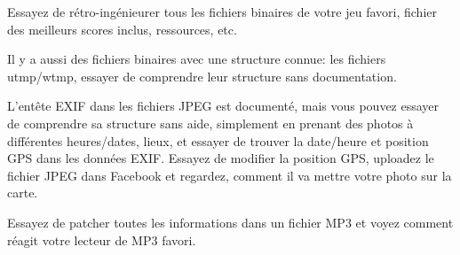 
Essayez de rétro-ingénieurer tous les fichiers binaires de votre jeu favori, fichier
des meilleurs scores inclus, ressources, etc.

Il y a aussi des fichiers binaires avec une structure connue: les fichiers utmp/wtmp,
essayer de comprendre leur structure sans documentation.

L'entête EXIF dans les fichiers JPEG est documenté, mais vous pouvez essayer de comprendre
sa structure sans aide, simplement en prenant des photos à différentes heures/dates,
lieux, et essayer de trouver la date/heure et position GPS dans les données EXIF.
Essayez de modifier la position GPS, uploadez le fichier JPEG dans Facebook et regardez,
comment il va mettre votre photo sur la carte.

Essayez de patcher toutes les informations dans un fichier MP3 et voyez comment réagit
votre lecteur de MP3 favori.
